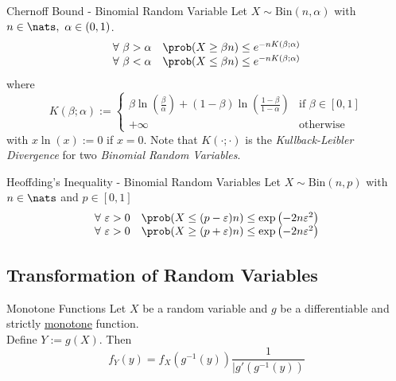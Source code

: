 \documentclass[11pt,a4paper]{article}
\begin{document}
  \begin{theorem}{Chernoff Bound - Binomial Random Variable}
    Let $X\sim\text{Bin}(n,\alpha)$ with $n\in\nats,\ \alpha\in(0,1)$.
    \[\begin{array}{rl}
      \forall\ \beta>\alpha&\prob(X\geq\beta n)\leq e^{-nK(\beta;\alpha)}\\
      \forall\ \beta<\alpha&\prob(X\leq\beta n)\leq e^{-nK(\beta;\alpha)}
    \end{array}\]
    where
    \[ K(\beta;\alpha):=\begin{cases}\beta\ln\left(\frac\beta\alpha\right)+(1-\beta)\ln\left(\frac{1-\beta}{1-\alpha}\right)&\text{if }\beta\in[0,1]\\+\infty&\text{otherwise}\end{cases} \]
    with $x\ln(x):=0$ if $x=0$. Note that $K(\cdot;\cdot)$ is the \textit{Kullback-Leibler Divergence} for two \textit{Binomial Random Variables}.
  \end{theorem}

  \begin{theorem}{Heoffding's Inequality - Binomial Random Variables}
    Let $X\sim\text{Bin}(n,p)$ with $n\in\nats$ and $p\in[0,1]$
    \[\begin{array}{rl}
      \forall\ \varepsilon>0&\prob(X\leq(p-\varepsilon)n)\leq\exp\left(-2n\varepsilon^2\right)\\
      \forall\ \varepsilon>0&\prob(X\geq(p+\varepsilon)n)\leq\exp\left(-2n\varepsilon^2\right)
    \end{array}\]
  \end{theorem}

\subsection{Transformation of Random Variables}



  \begin{theorem}{Monotone Functions}
    Let $X$ be a random variable and $g$ be a differentiable and strictly \underline{monotone} function.\\
    Define $Y:=g(X)$. Then
    \[ f_Y(y)=f_X(g^{-1}(y))\frac{1}{|g'(g^{-1}(y))} \]
  \end{theorem}
\end{document}
